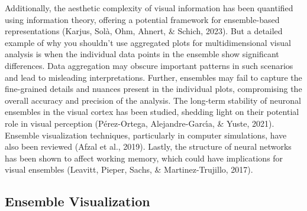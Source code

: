 \documentclass[print]{nuthesis}
\begin{document}
Additionally, the aesthetic complexity of visual information has been quantified using information theory, offering a potential framework for ensemble-based representations (Karjus, Solà, Ohm, Ahnert, \& Schich, 2023).
But a detailed example of why you shouldn't use aggregated plots for multidimensional visual analysis is when the individual data points in the ensemble show significant differences. Data aggregation may obscure important patterns in such scenarios and lead to misleading interpretations.
Further, ensembles may fail to capture the fine-grained details and nuances present in the individual plots, compromising the overall accuracy and precision of the analysis.
The long-term stability of neuronal ensembles in the visual cortex has been studied, shedding light on their potential role in visual perception (Pérez-Ortega, Alejandre-Garcı́a, \& Yuste, 2021).
Ensemble visualization techniques, particularly in computer simulations, have also been reviewed (Afzal et al., 2019).
Lastly, the structure of neural networks has been shown to affect working memory, which could have implications for visual ensembles (Leavitt, Pieper, Sachs, \& Martinez-Trujillo, 2017).

\hypertarget{ensemble-visualization}{%
\subsection{Ensemble Visualization}\label{ensemble-visualization}}
\end{document}
